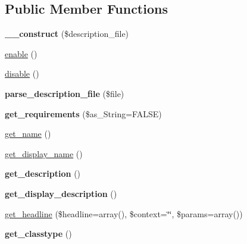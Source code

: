 \subsection*{Public Member Functions}
\begin{DoxyCompactItemize}
\item 
\hypertarget{classkoala__extension_a61c300d7a1467d868e34c2af61430c52}{
{\bfseries \_\-\_\-construct} (\$description\_\-file)}
\label{classkoala__extension_a61c300d7a1467d868e34c2af61430c52}

\item 
\hyperlink{classkoala__extension_ac8bd80afe0831fb1ef78f0933522562c}{enable} ()
\item 
\hyperlink{classkoala__extension_a1dd9a96fb047a83db4e077e444730b9c}{disable} ()
\item 
\hypertarget{classkoala__extension_a74b9767bf91c2a62774045a994ce62ea}{
{\bfseries parse\_\-description\_\-file} (\$file)}
\label{classkoala__extension_a74b9767bf91c2a62774045a994ce62ea}

\item 
\hypertarget{classkoala__extension_afee1590a5f04d34705fc923bdac03d9c}{
{\bfseries get\_\-requirements} (\$as\_\-String=FALSE)}
\label{classkoala__extension_afee1590a5f04d34705fc923bdac03d9c}

\item 
\hyperlink{classkoala__extension_ab8dccf6bc173178d10d2515395611409}{get\_\-name} ()
\item 
\hyperlink{classkoala__extension_a93ace89de47c878429d42ae2ae11fb17}{get\_\-display\_\-name} ()
\item 
\hypertarget{classkoala__extension_a316ad3437aef20204d9e184f7caac504}{
{\bfseries get\_\-description} ()}
\label{classkoala__extension_a316ad3437aef20204d9e184f7caac504}

\item 
\hypertarget{classkoala__extension_acbb987ea098fa0d76fe0b7e5a9c8b916}{
{\bfseries get\_\-display\_\-description} ()}
\label{classkoala__extension_acbb987ea098fa0d76fe0b7e5a9c8b916}

\item 
\hyperlink{classkoala__extension_ab29673d3586274a493bcbeff0d8a45e4}{get\_\-headline} (\$headline=array(), \$context=\char`\"{}\char`\"{}, \$params=array())
\item 
\hypertarget{classkoala__extension_a256bc5f5f99b36516b4947184112bf18}{
{\bfseries get\_\-classtype} ()}
\label{classkoala__extension_a256bc5f5f99b36516b4947184112bf18}


\end{DoxyCompactItemize}
